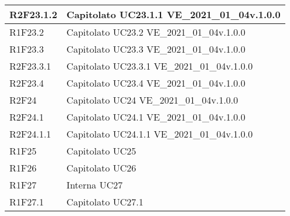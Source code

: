 \begin{center}
\begin{longtable}{|p{22mm}|p{44mm}|}
R2F23.1.2 &
Capitolato \newline
UC23.1.1 \newline
VE\_2021\_01\_04v.1.0.0 
\\
\hline

R1F23.2 &
Capitolato \newline
UC23.2 \newline
VE\_2021\_01\_04v.1.0.0 
\\
\hline

R1F23.3 &
Capitolato \newline
UC23.3 \newline
VE\_2021\_01\_04v.1.0.0 
\\
\hline

R2F23.3.1 &
Capitolato \newline
UC23.3.1 \newline
VE\_2021\_01\_04v.1.0.0 
\\
\hline

R2F23.4 &
Capitolato \newline
UC23.4 \newline
VE\_2021\_01\_04v.1.0.0 
\\
\hline

R2F24 &
Capitolato \newline
UC24 \newline
VE\_2021\_01\_04v.1.0.0 
\\
\hline

R2F24.1 &
Capitolato \newline
UC24.1 \newline
VE\_2021\_01\_04v.1.0.0 
\\
\hline

R2F24.1.1 &
Capitolato \newline
UC24.1.1 \newline
VE\_2021\_01\_04v.1.0.0 
\\
\hline

R1F25 &
Capitolato \newline
UC25 
\\
\hline

R1F26 &
Capitolato \newline
UC26 
\\
\hline

R1F27 &
Interna \newline
UC27 
\\
\hline

R1F27.1 &
Capitolato \newline
UC27.1 
\\
\hline


\end{longtable}
\end{center}
